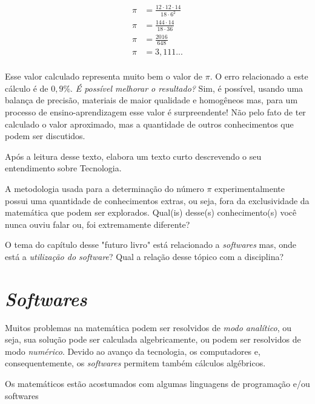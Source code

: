 \begin{ceqn}
	\begin{align*}
	\pi &= \frac{12 \cdot 12 \cdot 14}{18 \cdot 6^2} \\
	\pi &= \frac{144 \cdot 14}{18 \cdot 36} \\
	\pi &= \frac{2016}{648} \\
	\pi &= 3,111... \\
	\end{align*}
\end{ceqn}


Esse valor calculado representa muito bem o valor de $\pi$. O erro relacionado a este cálculo é de $0,9\%$. \textit{É possível melhorar o resultado?} Sim, é possível, usando uma balança de precisão, materiais de maior qualidade e homogêneos mas, para um processo de ensino-aprendizagem esse valor é surpreendente! Não pelo fato de ter calculado o valor aproximado, mas a quantidade de outros conhecimentos que podem ser discutidos.

\begin{exercise}
	Após a leitura desse texto, elabora um texto curto descrevendo o seu entendimento sobre Tecnologia.
\end{exercise}

\begin{exercise}
	A metodologia usada para a determinação do número $\pi$ experimentalmente possui uma quantidade de conhecimentos extras, ou seja, fora da exclusividade da matemática que podem ser explorados. Qual(is) desse(s) conhecimento(s) você nunca ouviu falar ou, foi extremamente diferente?
\end{exercise}

\begin{exercise}
	O tema do capítulo desse "futuro livro" está relacionado a \textit{softwares} mas, onde está a \textit{utilização do software}? Qual a relação desse tópico com a disciplina? 
\end{exercise}

\section{\textit{Softwares}}

Muitos problemas na matemática podem ser resolvidos de \textit{modo analítico}, ou seja, sua solução pode ser calculada algebricamente, ou podem ser resolvidos de modo \textit{numérico}. Devido ao avanço da tecnologia, os computadores e, consequentemente, os \textit{softwares} permitem também cálculos algébricos.

Os matemáticos estão acostumados com algumas linguagens de programação e/ou softwares